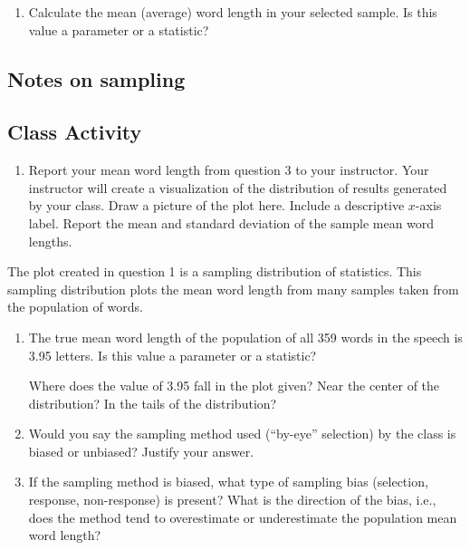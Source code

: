 \documentclass[
]{report}
\providecommand{\tightlist}{%
  \setlength{\itemsep}{0pt}\setlength{\parskip}{0pt}}
\begin{document}
\begin{enumerate}
\def\labelenumi{\arabic{enumi}.}
\setcounter{enumi}{2}
\tightlist
\item
  Calculate the mean (average) word length in your selected sample. Is this value a parameter or a statistic?\\
  \vspace{0.3in}
\end{enumerate}

\subsection*{Notes on sampling}\label{notes-on-sampling}

\vspace{5in}

\subsection{Class Activity}\label{class-activity}

\begin{enumerate}
\def\labelenumi{\arabic{enumi}.}
\tightlist
\item
  Report your mean word length from question 3 to your instructor. Your instructor will create a visualization of the distribution of results generated by your class. Draw a picture of the plot here. Include a descriptive \(x\)-axis label. Report the mean and standard deviation of the sample mean word lengths.
\end{enumerate}

\vspace{2in}

\newpage

The plot created in question 1 is a sampling distribution of statistics. This sampling distribution plots the mean word length from many samples taken from the population of words.

\begin{enumerate}
\def\labelenumi{\arabic{enumi}.}
\setcounter{enumi}{1}
\item
  The true mean word length of the population of all 359 words in the speech is 3.95 letters. Is this value a parameter or a statistic?\\
  \vspace{0.2in}

  Where does the value of 3.95 fall in the plot given? Near the center of the distribution? In the tails of the distribution?
  \vspace{0.3in}
\item
  Would you say the sampling method used (``by-eye'' selection) by the class is biased or unbiased? Justify your answer.\\
  \vspace{0.5in}
\item
  If the sampling method is biased, what type of sampling bias (selection, response, non-response) is present? What is the direction of the bias, i.e., does the method tend to overestimate or underestimate the population mean word length?
  \vspace{0.5in}
\end{enumerate}
\end{document}
